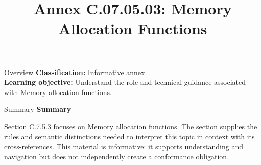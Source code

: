 \documentclass[10pt,letterpaper]{article}
\title{Annex C.07.05.03: Memory Allocation Functions}
\author{}
\date{}
\begin{document}
\maketitle
\begin{CornellOverviewBox}{Overview}
\textbf{Classification:} Informative annex\\[2pt]
\textbf{Learning objective:} Understand the role and technical guidance associated with Memory allocation functions.
\end{CornellOverviewBox}\begin{CornellSummaryBox}{Summary}
{\sffamily\bfseries\color{Accent} Summary}\par\vspace{3pt}Section C.7.5.3 focuses on Memory allocation functions. The section supplies the rules and semantic distinctions needed to interpret this topic in context with its cross-references. This material is informative: it supports understanding and navigation but does not independently create a conformance obligation.
\end{CornellSummaryBox}
\end{document}
